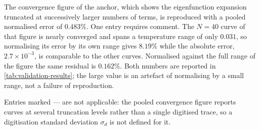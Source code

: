 \documentclass[preprint,12pt,a4paper]{elsarticle}
\theoremstyle{plain}
\theoremstyle{definition}
\theoremstyle{remark}
\begin{document}
The convergence figure of the anchor, which shows the eigenfunction expansion
truncated at successively larger numbers of terms, is reproduced with a pooled
normalised error of $0.483\%$. One entry requires comment. The $N=40$ curve of that figure is nearly converged and spans a
temperature range of only $0.031$, so normalising its error by its own range
gives $8.19\%$ while the absolute error, $2.7\times10^{-3}$, is comparable to
the other curves. Normalised against the full range of the figure the same
residual is $0.162\%$. Both numbers are reported in
\cref{tab:validation-results}; the large value is an artefact of normalising by
a small range, not a failure of reproduction.
\begin{table}[htbp]
  \centering
  \caption{External validation of the forward operator against the published
           figures of the anchor \cite{Kovacs2018}. $\sigma_{d}$ is the
           digitisation noise floor \eqref{eq:sigmad}. A ratio
           $\mathrm{RMSE}/\sigma_{d} < 1$ means the reproduction error is
           below the precision with which the published curve can be read.
           These figures are reproductions for validation, not original
           results.}
  \label{tab:validation-results}
  \small
  \setlength{\tabcolsep}{4.2pt}
  \par\smallskip\footnotesize
  Entries marked --- are not applicable: the pooled convergence figure
  reports curves at several truncation levels rather than a single
  digitised trace, so a digitisation standard deviation $\sigma_{d}$ is
  not defined for it.
\end{table}
\end{document}
